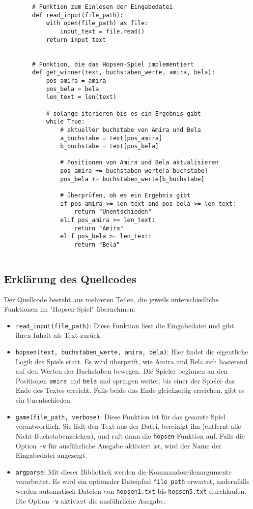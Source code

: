 \documentclass[a4paper,10pt,ngerman]{scrartcl}
\begin{document}
	
	\begin{lstlisting}
		# Funktion zum Einlesen der Eingabedatei
		def read_input(file_path):
			with open(file_path) as file:
				input_text = file.read()
			return input_text
			
		
		# Funktion, die das Hopsen-Spiel implementiert
		def get_winner(text, buchstaben_werte, amira, bela):
			pos_amira = amira
			pos_bela = bela
			len_text = len(text)
			
			# solange iterieren bis es ein Ergebnis gibt
			while True:
				# aktueller buchstabe von Amira und Bela
				a_buchstabe = text[pos_amira]
				b_buchstabe = text[pos_bela]
				
				# Positionen von Amira und Bela aktualisieren
				pos_amira += buchstaben_werte[a_buchstabe]
				pos_bela += buchstaben_werte[b_buchstabe]
				
				# überprüfen, ob es ein Ergebnis gibt
				if pos_amira >= len_text and pos_bela >= len_text:
					return "Unentschieden"
				elif pos_amira >= len_text:
					return "Amira"
				elif pos_bela >= len_text:
					return "Bela"
		
	\end{lstlisting}
	
	\subsection{Erklärung des Quellcodes}
	
	Der Quellcode besteht aus mehreren Teilen, die jeweils unterschiedliche Funktionen im "Hopsen-Spiel" übernehmen:
	
	\begin{itemize}
		\item \texttt{read\_input(file\_path)}: Diese Funktion liest die Eingabedatei und gibt ihren Inhalt als Text zurück.
		\item \texttt{hopsen(text, buchstaben\_werte, amira, bela)}: Hier findet die eigentliche Logik des Spiels statt. Es wird überprüft, wie Amira und Bela sich basierend auf den Werten der Buchstaben bewegen. Die Spieler beginnen an den Positionen \texttt{amira} und \texttt{bela} und springen weiter, bis einer der Spieler das Ende des Textes erreicht. Falls beide das Ende gleichzeitig erreichen, gibt es ein Unentschieden.
		\item \texttt{game(file\_path, verbose)}: Diese Funktion ist für das gesamte Spiel verantwortlich. Sie lädt den Text aus der Datei, bereinigt ihn (entfernt alle Nicht-Buchstabenzeichen), und ruft dann die \texttt{hopsen}-Funktion auf. Falls die Option \texttt{-v} für ausführliche Ausgabe aktiviert ist, wird der Name der Eingabedatei angezeigt.
		\item \texttt{argparse}: Mit dieser Bibliothek werden die Kommandozeilenargumente verarbeitet. Es wird ein optionaler Dateipfad \texttt{file\_path} erwartet, andernfalls werden automatisch Dateien von \texttt{hopsen1.txt} bis \texttt{hopsen5.txt} durchlaufen. Die Option \texttt{-v} aktiviert die ausführliche Ausgabe.
	\end{itemize}
	
\end{document}
